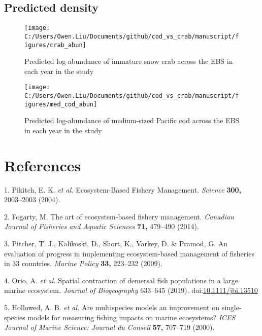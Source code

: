 \documentclass[11pt,]{article}
\begin{document}
\hypertarget{predicted-density}{%
\subsection{Predicted density}\label{predicted-density}}

\begin{figure}
\texttt{[image: C:/Users/Owen.Liu/Documents/github/cod\_vs\_crab/manuscript/figures/crab\_abun]} \caption{Predicted log-abundance of immature snow crab across the EBS in each year in the study}\label{fig:crabdens}
\end{figure}

\begin{figure}
\texttt{[image: C:/Users/Owen.Liu/Documents/github/cod\_vs\_crab/manuscript/figures/med\_cod\_abun]} \caption{Predicted log-abundance of medium-sized Pacific cod across the EBS in each year in the study}\label{fig:coddens}
\end{figure}

\hypertarget{references}{%
\section*{References}\label{references}}

\hypertarget{refs}{}
\leavevmode\hypertarget{ref-Pikitch2004}{}%
1. Pikitch, E. K. \emph{et al.} Ecosystem-Based Fishery Management. \emph{Science} \textbf{300,} 2003--2003 (2004).

\leavevmode\hypertarget{ref-Fogarty2014}{}%
2. Fogarty, M. The art of ecosystem-based fishery management. \emph{Canadian Journal of Fisheries and Aquatic Sciences} \textbf{71,} 479--490 (2014).

\leavevmode\hypertarget{ref-Pitcher2009}{}%
3. Pitcher, T. J., Kalikoski, D., Short, K., Varkey, D. \& Pramod, G. An evaluation of progress in implementing ecosystem-based management of fisheries in 33 countries. \emph{Marine Policy} \textbf{33,} 223--232 (2009).

\leavevmode\hypertarget{ref-Orio2019}{}%
4. Orio, A. \emph{et al.} Spatial contraction of demersal fish populations in a large marine ecosystem. \emph{Journal of Biogeography} 633--645 (2019). doi:\href{https://doi.org/10.1111/jbi.13510}{10.1111/jbi.13510}

\leavevmode\hypertarget{ref-Hollowed2000}{}%
5. Hollowed, A. B. \emph{et al.} Are multispecies models an improvement on single-species models for measuring fishing impacts on marine ecosystems? \emph{ICES Journal of Marine Science: Journal du Conseil} \textbf{57,} 707--719 (2000).
\end{document}

